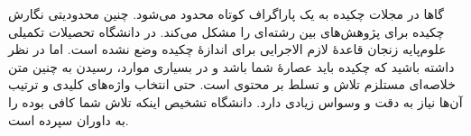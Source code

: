 گاها در مجلات چکیده به یک پاراگراف کوتاه محدود می‌شود. چنین محدودیتی نگارش چکیده برای پژوهش‌های بین رشته‌ای را مشکل می‌کند. در دانشگاه تحصیلات تکمیلی علوم‌پایه زنجان قاعدهٔ لازم الاجرایی برای اندازهٔ چکیده وضع نشده است. اما در نظر داشته باشید که چکیده باید عصارهٔ
\thesis 
شما باشد و در بسیاری موارد، رسیدن به چنین متن خلاصه‌ای مستلزم تلاش و تسلط بر محتوی 
\thesis 
است. حتی انتخاب واژه‌های کلیدی و ترتیب آن‌ها نیاز به دقت و وسواس زیادی دارد. دانشگاه تشخیص اینکه تلاش شما کافی بوده را به داوران سپرده است.
